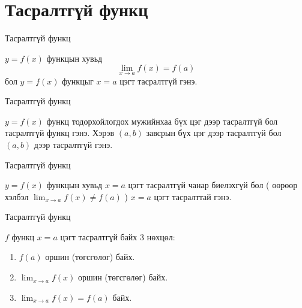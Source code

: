 

\section{Тасралтгүй функц}
\begin{frame}[allowframebreaks]{Тасралтгүй функц}
\begin{definition}
$y=f(x)$ функцын хувьд  
$$\displaystyle \lim_{x\to a} f(x)=f(a)$$ бол $y=f(x)$ функцыг $x=a$ цэгт тасралтгүй гэнэ.
\end{definition}
\end{frame}

\begin{frame}[allowframebreaks]{Тасралтгүй функц}
\begin{definition}
$y=f(x)$ функц тодорхойлогдох мужийнхаа бүх цэг дээр тасралтгүй бол тасралтгүй функц гэнэ. Хэрэв $(a,b)$ завсрын бүх цэг дээр тасралтгүй бол $(a,b)$ дээр тасралтгүй гэнэ.
\end{definition}
\end{frame}

\begin{frame}[allowframebreaks]{Тасралтгүй функц}
\begin{definition} $y=f(x)$ функцын хувьд $x=a$ цэгт тасралтгүй чанар биелэхгүй бол ( өөрөөр хэлбэл 
$\displaystyle \lim_{x\to a} f(x)\neq f(a)$ ) $x=a$ цэгт тасралттай гэнэ.
\end{definition}
\end{frame}

\begin{frame}[allowframebreaks]{Тасралтгүй функц}
\begin{note}
$f$ функц $x=a$ цэгт тасралтгүй байх 3 нөхцөл:
\begin{enumerate}[label=\arabic*)]
\item $f(a)$ оршин (төгсгөлөг) байх.
\item $\displaystyle \lim_{x\to a} f(x)$ оршин (төгсгөлөг) байх.
\item $\displaystyle \lim_{x\to a} f(x)=f(a)$ байх.
\end{enumerate}
\end{note}
\end{frame}

